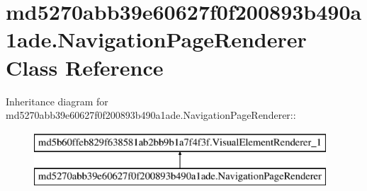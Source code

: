 \hypertarget{classmd5270abb39e60627f0f200893b490a1ade_1_1_navigation_page_renderer}{
\section{md5270abb39e60627f0f200893b490a1ade.NavigationPageRenderer Class Reference}
\label{classmd5270abb39e60627f0f200893b490a1ade_1_1_navigation_page_renderer}
}
Inheritance diagram for md5270abb39e60627f0f200893b490a1ade.NavigationPageRenderer::\begin{figure}[H]
\begin{center}
\leavevmode
\includegraphics[height=2cm]{classmd5270abb39e60627f0f200893b490a1ade_1_1_navigation_page_renderer}
\end{center}
\end{figure}
